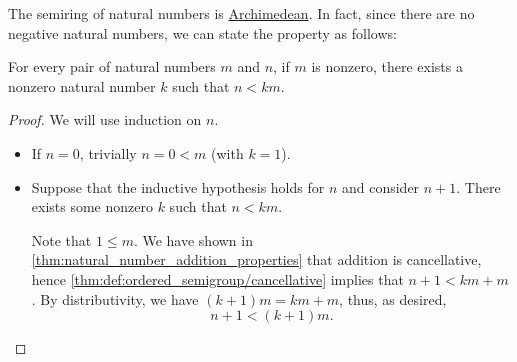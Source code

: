 \begin{proposition}\label{thm:natural_numbers_archimedean}
  The semiring of natural numbers is \hyperref[def:archimedean_semiring]{Archimedean}. In fact, since there are no negative natural numbers, we can state the property as follows:
  \begin{displayquote}
    For every pair of natural numbers \( m \) and \( n \), if \( m \) is nonzero, there exists a nonzero natural number \( k \) such that \( n < km \).
  \end{displayquote}
\end{proposition}
\begin{proof}
  We will use induction on \( n \).

  \begin{itemize}
    \item If \( n = 0 \), trivially \( n = 0 < m \) (with \( k = 1 \)).

    \item Suppose that the inductive hypothesis holds for \( n \) and consider \( n + 1 \). There exists some nonzero \( k \) such that \( n < km \).

    Note that \( 1 \leq m \). We have shown in \cref{thm:natural_number_addition_properties} that addition is cancellative, hence \cref{thm:def:ordered_semigroup/cancellative} implies that \( n + 1 < km + m \). By distributivity, we have \( (k + 1)m = km + m \), thus, as desired,
    \begin{equation*}
      n + 1 < (k + 1)m.
    \end{equation*}
  \end{itemize}
\end{proof}


